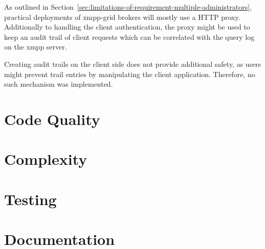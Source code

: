 As outlined in Section~\ref{sec:limitations-of-requirement-multiple-administrators}, practical deployments of \gls{xmpp-grid} \glspl{broker} will mostly use a HTTP proxy.
Additionally to handling the client authentication, the proxy might be used to keep an audit trail of client requests which can be correlated with the query log on the \gls{xmpp} server.

Creating audit trails on the client side does not provide additional safety, as users might prevent trail entries by manipulating the client application. Therefore, no such mechanism was implemented.



\section{Code Quality}


\section{Complexity}
\section{Testing}


\section{Documentation}
